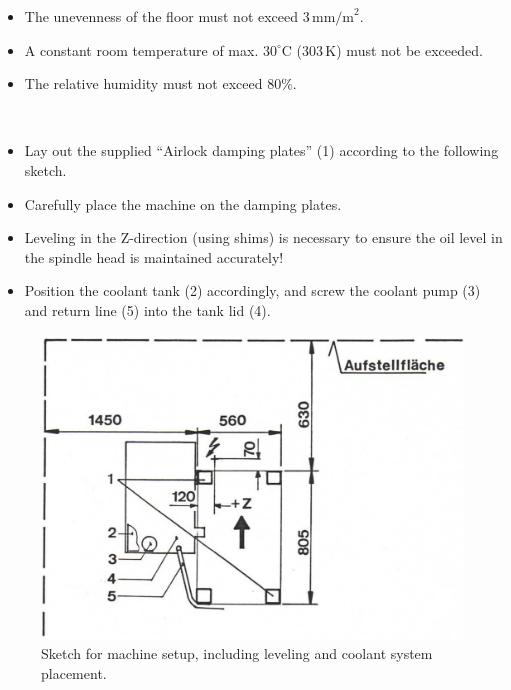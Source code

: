 
\begin{itemize}
    \item The unevenness of the floor must not exceed $3 \, \text{mm/m}^2$.
    \item A constant room temperature of max. $30^\circ \text{C}$ ($303 \, \text{K}$) must not be exceeded.
    \item The relative humidity must not exceed $80\%$.
\end{itemize}


\\

\newpage
{}

\begin{itemize}
    \item Lay out the supplied \enquote{Airlock damping plates} (1) according to the following sketch.
    \item Carefully place the machine on the damping plates.
    \item Leveling in the Z-direction (using shims) is necessary to ensure the oil level in the spindle head is maintained accurately!
    \item Position the coolant tank (2) accordingly, and screw the coolant pump (3) and return line (5) into the tank lid (4).
\end{itemize}

\vspace{1cm}

\begin{figure}[h!]
    \centering
    \includegraphics[width=\textwidth]{images/machine_setup_sketch.jpg}
    \caption{Sketch for machine setup, including leveling and coolant system placement.}
    \label{fig:machine_setup_sketch}
\end{figure}

